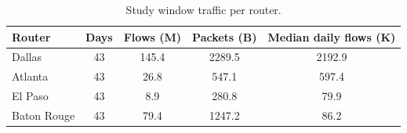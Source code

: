 \begin{table}[t]
\caption{Study window traffic per router.}
\label{tab:dataset}
\centering
\begin{tabular}{lcccc}
\hline
\textbf{Router} & \textbf{Days} & \textbf{Flows (M)} & \textbf{Packets (B)} & \textbf{Median daily flows (K)} \\
\hline
Dallas & 43 & 145.4 & 2289.5 & 2192.9 \\
Atlanta & 43 & 26.8 & 547.1 & 597.4 \\
El Paso & 43 & 8.9 & 280.8 & 79.9 \\
Baton Rouge & 43 & 79.4 & 1247.2 & 86.2 \\
\hline
\end{tabular}
\end{table}
